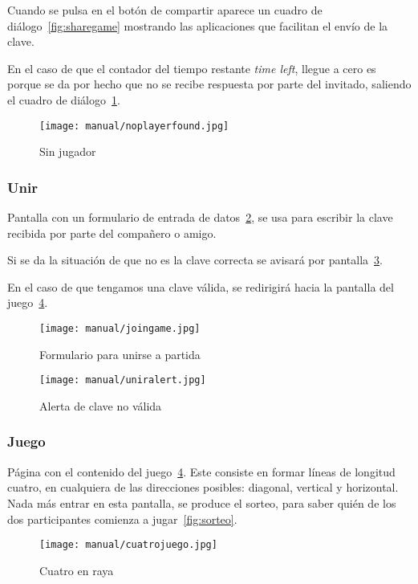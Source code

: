 Cuando se pulsa en el botón de compartir aparece un cuadro de diálogo~\ref{fig:sharegame} mostrando las aplicaciones que facilitan el envío de la clave.

En el caso de que el contador del tiempo restante \emph{time left}, llegue a cero es porque se da por hecho que no se recibe respuesta por parte del invitado, saliendo el cuadro de diálogo~\ref{fig:noplayerfound}.

\begin{figure}[H]
	\centering
	\texttt{[image: manual/noplayerfound.jpg]}
	\caption{Sin jugador}\label{fig:noplayerfound}
\end{figure}

\subsubsection{Unir}\label{cuatrounir}
Pantalla con un formulario de entrada de datos~\ref{fig:cuatrounir}, se usa para escribir la clave recibida por parte del compañero o amigo. 

Si se da la situación de que no es la clave correcta se avisará por pantalla~\ref{fig:uniralert}.

En el caso de que tengamos una clave válida, se redirigirá hacia la pantalla del juego~\ref{fig:cuatrojuego}.

\begin{figure}[H]
	\centering
	\texttt{[image: manual/joingame.jpg]}
	\caption{Formulario para unirse a partida}\label{fig:cuatrounir}
\end{figure}

\begin{figure}[H]
	\centering
	\texttt{[image: manual/uniralert.jpg]}
	\caption{Alerta de clave no válida}\label{fig:uniralert}
\end{figure}

\subsubsection{Juego}\label{cuatrojuego}
Página con el contenido del juego~\ref{fig:cuatrojuego}. Este consiste en formar líneas de longitud cuatro, en cualquiera de las direcciones posibles: diagonal, vertical y horizontal. Nada más entrar en esta pantalla, se produce el sorteo, para saber quién de los dos participantes comienza a jugar~\ref{fig:sorteo}.

\begin{figure}[H]
	\centering
	\texttt{[image: manual/cuatrojuego.jpg]}
	\caption{Cuatro en raya}\label{fig:cuatrojuego}
\end{figure}

